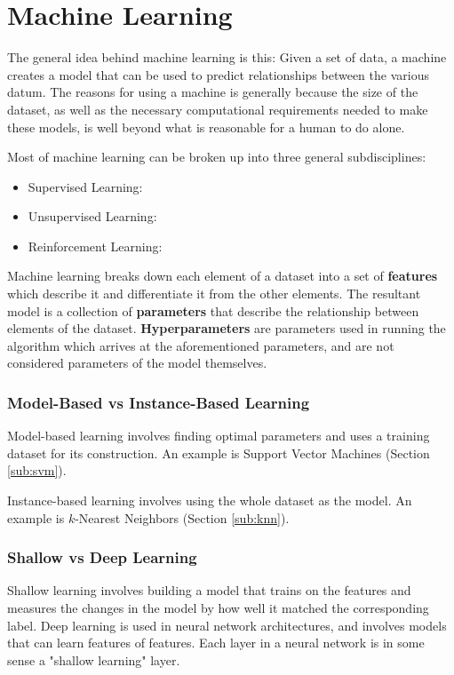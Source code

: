 
\chapter{Machine Learning}

The general idea behind machine learning is this: Given a set of data, a machine creates a model that can be used to predict relationships between the various datum. The reasons for using a machine is generally because the size of the dataset, as well as the necessary computational requirements needed to make these models, is well beyond what is reasonable for a human to do alone.

Most of machine learning can be broken up into three general subdisciplines:
\begin{itemize}
	\item Supervised Learning:
	\item Unsupervised Learning:
	\item Reinforcement Learning:
\end{itemize}

Machine learning breaks down each element of a dataset into a set of \textbf{features} which describe it and differentiate it from the other elements. The resultant model is a collection of \textbf{parameters} that describe the relationship between elements of the dataset. \textbf{Hyperparameters} are parameters used in running the algorithm which arrives at the aforementioned parameters, and are not considered parameters of the model themselves.

\subsection{Model-Based vs Instance-Based Learning}
Model-based learning involves finding optimal parameters and uses a training dataset for its construction. An example is Support Vector Machines (Section \ref{sub:svm}).

Instance-based learning involves using the whole dataset as the model. An example is $k$-Nearest Neighbors (Section \ref{sub:knn}).

\subsection{Shallow vs Deep Learning}
Shallow learning involves building a model that trains on the features and measures the changes in the model by how well it matched the corresponding label. Deep learning is used in neural network architectures, and involves models that can learn features of features. Each layer in a neural network is in some sense a "shallow learning" layer.

